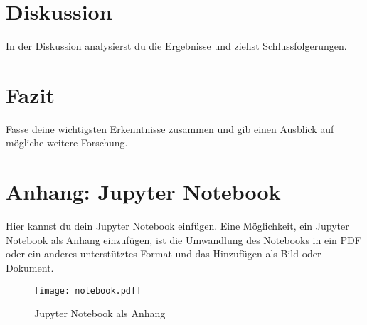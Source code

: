 \documentclass[a4paper,12pt]{article}
\begin{document}
\section{Diskussion}
In der Diskussion analysierst du die Ergebnisse und ziehst Schlussfolgerungen.

\section{Fazit}
Fasse deine wichtigsten Erkenntnisse zusammen und gib einen Ausblick auf mögliche weitere Forschung.

\newpage

\appendix
\section{Anhang: Jupyter Notebook}
Hier kannst du dein Jupyter Notebook einfügen. Eine Möglichkeit, ein Jupyter Notebook als Anhang einzufügen, ist die Umwandlung des Notebooks in ein PDF oder ein anderes unterstütztes Format und das Hinzufügen als Bild oder Dokument.

\begin{figure}[h!]
    \centering
    \texttt{[image: notebook.pdf]}
    \caption{Jupyter Notebook als Anhang}
\end{figure}
\end{document}
